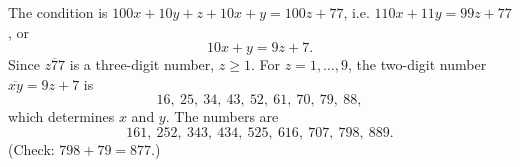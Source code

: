 The condition is $100x+10y+z+10x+y=100z+77$, i.e. $110x+11y=99z+77$, or
\[10x+y=9z+7.\]
Since $\overline{z77}$ is a three-digit number, $z\ge1$. For $z=1,\dots,9$, the two-digit number $\overline{xy}=9z+7$ is
\[16,\ 25,\ 34,\ 43,\ 52,\ 61,\ 70,\ 79,\ 88,\]
which determines $x$ and $y$. The numbers are
\[\boxed{161,\ 252,\ 343,\ 434,\ 525,\ 616,\ 707,\ 798,\ 889}.\]
(Check: $798+79=877$.)

